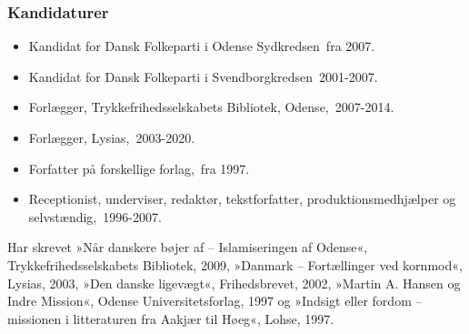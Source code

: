 \documentclass[11pt, a4paper]{awesome-cv}
\begin{document}
\begin{cvletter}
\subsubsection*{Kandidaturer}
\begin{itemize}
\item Kandidat for Dansk Folkeparti i Odense Sydkredsen fra 2007.
\item Kandidat for Dansk Folkeparti i Svendborgkredsen 2001-2007.
\end{itemize}
\begin{itemize}
\item Forlægger, Trykkefrihedsselskabets Bibliotek, Odense, 2007-2014.
\item Forlægger, Lysias, 2003-2020.
\item Forfatter på forskellige forlag, fra 1997.
\item Receptionist, underviser, redaktør, tekstforfatter, produktionsmedhjælper og selvstændig, 1996-2007.
\end{itemize}
Har skrevet »Når danskere bøjer af – Islamiseringen af Odense«, Trykkefrihedsselskabets Bibliotek, 2009, »Danmark – Fortællinger ved kornmod«, Lysias, 2003, »Den danske ligevægt«, Frihedsbrevet, 2002, »Martin A. Hansen og Indre Mission«, Odense Universitetsforlag, 1997 og »Indsigt eller fordom – missionen i litteraturen fra Aakjær til Høeg«, Lohse, 1997.

\end{cvletter}
\end{document}
